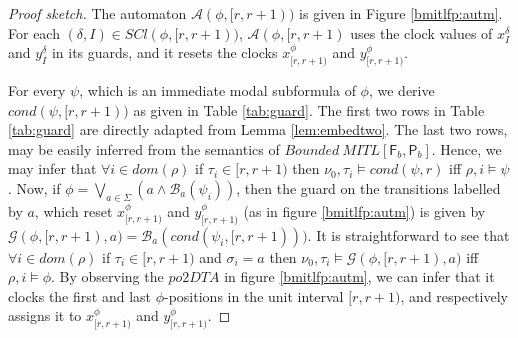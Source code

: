 \documentclass{llncs}
\newcommand{\fut}{\textsf{F}}
\newcommand{\past}{\textsf{P}}
\newcommand{\bmitlfp}{\mbox{$\mathit{Bounded ~MITL[\fut_b,\past_b]}$}}
\newcommand{\potdta}{\mbox{$\mathit{po2DTA}$}}
\newcommand{\autm}{\mathcal A}
\newcommand{\mitlfpb}{\bmitlfp}
\begin{document}
\begin{proof}[Proof sketch]
The automaton $\autm(\phi,[r,r+1))$ is given in Figure \ref{bmitlfp:autm}. For each $(\delta,I) \in SCl(\phi,[r,r+1))$, $\autm(\phi,[r,r+1)$ uses the  clock values of $x^{\delta}_{I}$ and $y^{\delta}_{I}$ in its guards, and it resets the clocks $x^\phi_{[r,r+1)}$ and $y^\phi_{[r,r+1)}$. 

For every $\psi$, which is an immediate modal subformula of $\phi$, we derive $cond(\psi,[r,r+1))$ as given in Table \ref{tab:guard}. The first two rows in Table \ref{tab:guard} are directly adapted from Lemma \ref{lem:embedtwo}. The last two rows, may be easily inferred from the semantics of \mitlfpb. Hence, we may infer that $\forall i\in dom(\rho)$ if $\tau_i\in [r,r+1)$ then $\nu_0,\tau_i\models cond(\psi,r)$ iff $\rho,i\models\psi$. Now, if $\phi = \bigvee\limits_{a\in\Sigma} (a \land \mathscr B_a(\psi_i))$, then the guard on the transitions labelled by $a$, which reset $x^\phi_{[r,r+1)}$ and $y^\phi_{[r,r+1)}$ (as in figure \ref{bmitlfp:autm}) is given by $\mathcal G(\phi,[r,r+1),a) = \mathscr B_a(cond(\psi_i,[r,r+1)))$. It is straightforward to see that $\forall i\in dom(\rho)$ if $\tau_i\in [r,r+1)$ and $\sigma_i=a$ then $\nu_0,\tau_i\models\mathcal G(\phi,[r,r+1),a)$ iff $\rho,i\models\phi$. By observing the \potdta\/ in figure  \ref{bmitlfp:autm},  we can infer that it clocks the first and last $\phi$-positions in the unit interval $[r,r+1)$, and respectively assigns it to $x^\phi_{[r,r+1)}$ and $y^\phi_{[r,r+1)}$. 
\end{proof}
\end{document}
